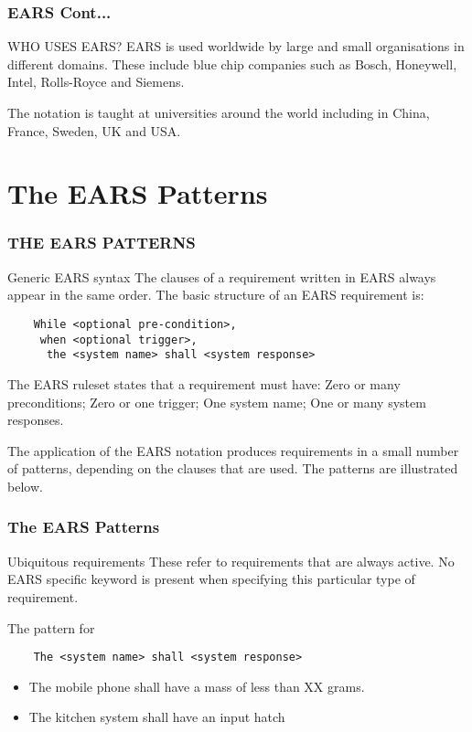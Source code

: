 \documentclass[aspectratio=169]{beamer}
\begin{document}
\begin{frame}
  \frametitle{EARS Cont...}
  \begin{block}{WHO USES EARS?}
    EARS is used worldwide by large and small organisations in different domains. These include blue chip companies such as Bosch, Honeywell, Intel, Rolls-Royce and Siemens.

The notation is taught at universities around the world including in China, France, Sweden, UK and USA.
  \end{block}

\end{frame}

\section*{The EARS Patterns}

\begin{frame}[fragile]
  \frametitle{THE EARS PATTERNS}
  \begin{block}{Generic EARS syntax}
    The clauses of a requirement written in EARS always appear in the same order. The basic structure of an EARS requirement is:
    \begin{verbatim}
    While <optional pre-condition>, 
     when <optional trigger>, 
      the <system name> shall <system response>  
    \end{verbatim}
  The EARS ruleset states that a requirement must have: Zero or many preconditions; Zero or one trigger; One system name; One or many system responses.

The application of the EARS notation produces requirements in a small number of patterns, depending on the clauses that are used. The patterns are illustrated below.
  \end{block}
  

\end{frame}

\begin{frame}[fragile]
  \frametitle{The EARS Patterns}
  \begin{block}{Ubiquitous requirements}
    These refer to requirements that are always active. No EARS specific keyword is present when specifying this particular type of requirement.
    
    The pattern for 
    \begin{verbatim}
    The <system name> shall <system response>  
    \end{verbatim}
  \end{block}
  \begin{example}
    \begin{itemize}
      \item The mobile phone shall have a mass of less than XX grams.
      \item The kitchen system shall have an input hatch
    \end{itemize}
  \end{example}
\end{frame}
\end{document}

